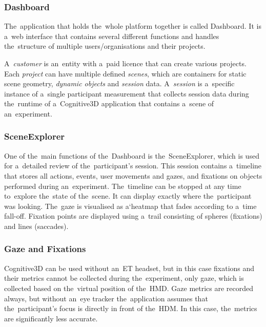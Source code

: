 \pagebreak{}



\subsubsection*{Dashboard}
The~application that holds the~whole platform together is called Dashboard. It is a~web interface that contains several different functions and handles the~structure of multiple users/organisations and their projects.~\cite{cognitive3d-dashboard-concepts}

A~\emph{customer} is an~entity with a~paid licence that can create various projects. Each \emph{project} can have multiple defined \emph{scenes}, which are containers for static scene geometry, \emph{dynamic objects} and \emph{session} data. A~\emph{session} is a~specific instance of a~single participant measurement that collects session data during the~runtime of a~Cognitive3D application that contains a~scene of an~experiment.

\subsubsection*{SceneExplorer}
One of the~main functions of the~Dashboard is the~SceneExplorer, which is used for a~detailed review of the~participant's session. This session contains a~timeline that stores all actions, events, user movements and gazes, and fixations on objects performed during an~experiment. The~timeline can be stopped at any time to~explore the~state of the~scene. It can display exactly where the~participant was looking. The~gaze is visualised as a`heatmap that fades according to a~time fall-off. Fixation points are displayed using a~trail consisting of spheres (fixations) and lines (saccades).~\cite{cognitive3d-scene-explorer}

\subsubsection*{Gaze and Fixations}
Cognitive3D can be used without an~ET headset, but in this case fixations and their metrics cannot be collected during the~experiment, only gaze, which is collected based on the~virtual position of the~HMD. Gaze metrics are recorded always, but without an~eye tracker the~application assumes that the~participant's focus is directly in front of the~HDM. In this case, the~metrics are significantly less accurate.~\cite{cognitive3d-unreal-gf}

